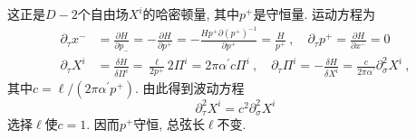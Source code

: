 这正是$D{-}2$个自由场$X^i$的哈密顿量, 其中$p^+$是守恒量. 运动方程为
\begin{subequations}
\begin{align}
\partial_{\tau} x^{-}&=\frac{\partial H}{\partial p_-}=-\frac{\partial H}{\partial p^{+}}=-\frac{H p^{+} \partial(p^+)^{-1}}{\partial p^{+}}=\frac{H}{p^+} \:,\quad
\partial_{\tau} p^{+}=\frac{\partial H}{\partial x^{-}}=0 \\
\partial_{\tau} X^{i}&=\frac{\delta H}{\delta \Pi^{i}}=\frac{\ell}{2 p^{+}} 2 \Pi^{i}=2 \pi\alpha^{\prime}c\Pi^{i} \:,\quad
\partial_\tau \Pi^{i}=-\frac{\delta H}{\delta X^{i}}=\frac{c}{2 \pi \alpha^{\prime}} \partial_{\sigma}^{2} X^{i} \:,
\end{align}
\end{subequations}
其中$c=\ell/(2 \pi \alpha^{\prime} p^{+})$.
由此得到波动方程
\begin{equation}
\partial_{\tau}^{2} X^{i}=c^{2} \partial_{\sigma}^{2} X^{i}
\end{equation}
选择$\ell$使$c=1$. 因而$p^+$守恒, 总弦长$\ell$不变. 

